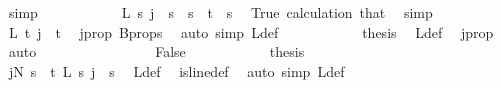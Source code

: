 \begin{isabellebody}
\ simp\isanewline
\ \ \ \ \ \ \ \ \isamarkupfalse%
\ \isamarkupfalse%
\ {\isachardoublequoteopen}L{\isacharprime}{\kern0pt}\ s\ j\ {\isacharequal}{\kern0pt}\ s{\isachardoublequoteclose}\ \ {\isachardoublequoteopen}s\ {\isacharless}{\kern0pt}\ t{\isachardoublequoteclose}\ \ s\ \isamarkupfalse%
\ True\ calculation\ that\ \isamarkupfalse%
\ simp\isanewline
\ \ \ \ \ \ \ \ \isamarkupfalse%
\ \isamarkupfalse%
\ {\isachardoublequoteopen}L{\isacharprime}{\kern0pt}\ t\ j\ {\isacharequal}{\kern0pt}\ t{\isachardoublequoteclose}\ \isamarkupfalse%
\ j{\isacharunderscore}{\kern0pt}prop\ B{\isacharunderscore}{\kern0pt}props\ \isamarkupfalse%
\ {\isacharparenleft}{\kern0pt}auto\ simp{\isacharcolon}{\kern0pt}\ L{\isacharprime}{\kern0pt}{\isacharunderscore}{\kern0pt}def{\isacharparenright}{\kern0pt}\isanewline
\ \ \ \ \ \ \ \ \isamarkupfalse%
\ \isamarkupfalse%
\ {\isacharquery}{\kern0pt}thesis\ \isamarkupfalse%
\ L{\isacharprime}{\kern0pt}{\isacharunderscore}{\kern0pt}def\ \isamarkupfalse%
\ j{\isacharunderscore}{\kern0pt}prop\ \isamarkupfalse%
\ auto\isanewline
\ \ \ \ \ \ \isamarkupfalse%
\isanewline
\ \ \ \ \ \ \ \ \isamarkupfalse%
\ False\isanewline
\ \ \ \ \ \ \ \ \isamarkupfalse%
\ \isamarkupfalse%
\ {\isacharquery}{\kern0pt}thesis\isanewline
\ \ \ \ \ \ \ \ \isamarkupfalse%
{\isacharminus}{\kern0pt}\isanewline
\ \ \ \ \ \ \ \ \ \ \isamarkupfalse%
\ {\isachardoublequoteopen}{\isacharparenleft}{\kern0pt}{\isasymexists}j{\isacharless}{\kern0pt}N{\isacharprime}{\kern0pt}{\isachardot}{\kern0pt}\ {\isacharparenleft}{\kern0pt}{\isasymforall}s\ {\isacharless}{\kern0pt}\ t{\isachardot}{\kern0pt}\ L{\isacharprime}{\kern0pt}\ s\ j\ {\isacharequal}{\kern0pt}\ s{\isacharparenright}{\kern0pt}{\isacharparenright}{\kern0pt}{\isachardoublequoteclose}\ \isamarkupfalse%
\ L{\isacharunderscore}{\kern0pt}def\ \isamarkupfalse%
\ is{\isacharunderscore}{\kern0pt}line{\isacharunderscore}{\kern0pt}def\ \isamarkupfalse%
\ {\isacharparenleft}{\kern0pt}auto\ simp{\isacharcolon}{\kern0pt}\ L{\isacharprime}{\kern0pt}{\isacharunderscore}{\kern0pt}def{\isacharparenright}{\kern0pt}\isanewline
\ \ \ \ \ \ \ \ \ \ \isamarkupfalse%
\ \isamarkupfalse%

\end{isabellebody}
